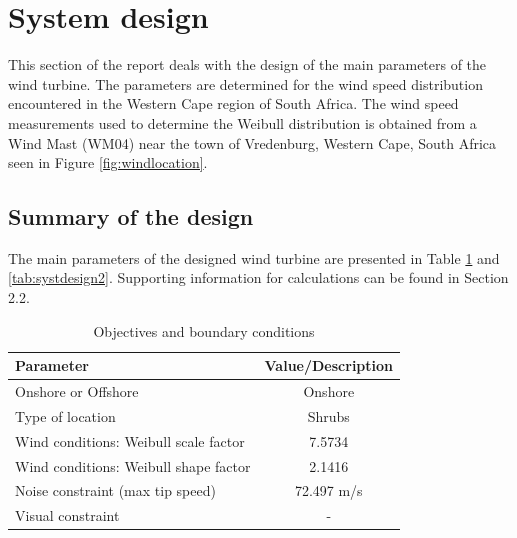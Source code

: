 \section{System design} \label{system design}
This section of the report deals with the design of the main parameters of the wind turbine. The parameters are determined for the wind speed distribution encountered in the Western Cape region of South Africa. The wind speed measurements used to determine the Weibull distribution is obtained from a Wind Mast (WM04) near the town of Vredenburg, Western Cape, South Africa seen in Figure \ref{fig:windlocation}.


\subsection{Summary of the design}

The main parameters of the designed wind turbine are presented in Table \ref{tab:systdesign1} and \ref{tab:systdesign2}. Supporting information for calculations can be found in Section 2.2.

\begin{table}[H]
\begin{center} 
\caption{Objectives and boundary conditions}\label{tab:systdesign1}
\begin{tabular}{ |l|c| } 
\hline
\textbf{Parameter} & \textbf{Value/Description}  \\ 
\hline
Onshore or Offshore & Onshore  \\ 
\hline
Type of location & Shrubs \\ 
\hline
Wind conditions: Weibull scale factor & 7.5734 \\
\hline
Wind conditions: Weibull shape factor & 2.1416 \\
\hline
Noise constraint (max tip speed) & 72.497 m/s \\
\hline
Visual constraint & - \\
\hline
\end{tabular}
\end{center}
\end{table}

